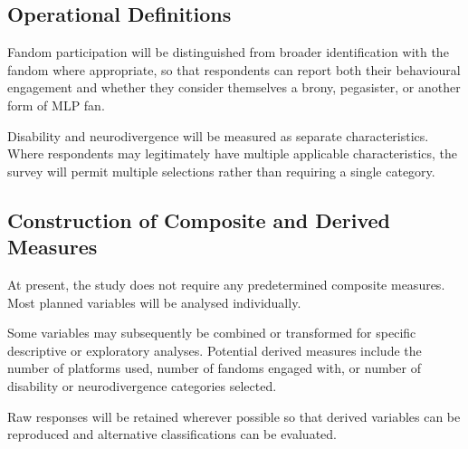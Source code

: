 \subsection{Operational Definitions}

Fandom participation will be distinguished from broader identification with the fandom where appropriate, so that respondents can report both their behavioural engagement and whether they consider themselves a brony, pegasister, or another form of MLP fan.

Disability and neurodivergence will be measured as separate characteristics. Where respondents may legitimately have multiple applicable characteristics, the survey will permit multiple selections rather than requiring a single category.


\subsection{Construction of Composite and Derived Measures}

At present, the study does not require any predetermined composite measures. Most planned variables will be analysed individually.

Some variables may subsequently be combined or transformed for specific descriptive or exploratory analyses. Potential derived measures include the number of platforms used, number of fandoms engaged with, or number of disability or neurodivergence categories selected.

Raw responses will be retained wherever possible so that derived variables can be reproduced and alternative classifications can be evaluated.

